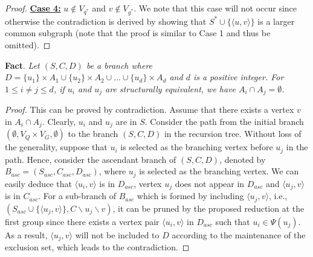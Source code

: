 \begin{proof}
    \smallskip
    \noindent\underline{\textbf{Case 4:}} $u\notin V_{q^*}$ and $v\notin V_{g^*}$. We note that this case will not occur since otherwise the contradiction is derived by showing that $S^*\cup \{\langle u,v\rangle\}$ is a larger common subgraph (note that the proof is similar to Case 1 and thus be omitted).
\end{proof}


\smallskip
\noindent\textbf{Fact}. \emph{Let $(S,C,D)$ be a branch where $D=\{u_1\}\times A_1 \cup \{u_2\} \times A_2 \cup ... \cup \{u_d\}\times A_d$ and $d$ is a positive integer. For $1\leq i\neq j \leq d$, if $u_i$ and $u_j$ are structurally equivalent, we have $A_i\cap A_j = \emptyset$.}
\begin{proof}
    This can be proved by contradiction. Assume that there exists a vertex $v$ in $A_i\cap A_j$. Clearly, $u_i$ and $u_j$ are in $S$. Consider the path from the initial branch $(\emptyset,V_Q\times V_G,\emptyset)$ to the branch $(S,C,D)$ in the recursion tree. Without loss of the generality, suppose that $u_i$ is selected as the branching vertex before $u_j$ in the path. Hence, consider the ascendant branch of $(S,C,D)$, denoted by $B_{asc}=(S_{asc},C_{asc},D_{asc})$, where $u_j$ is selected as the branching vertex. We can easily deduce that $\langle u_i,v \rangle$ is in $D_{asc}$, vertex $u_j$ does not appear in $D_{asc}$ and $\langle u_j,v \rangle$ is in $C_{asc}$. For a sub-branch of $B_{asc}$ which is formed by including $\langle u_j,v \rangle$, i.e., $(S_{asc}\cup\{\langle u_j,v \rangle\}, C\backslash u_j\backslash v)$, it can be pruned by the proposed reduction at the first group since there exists a vertex pair $\langle u_i,v \rangle$ in $D_{asc}$ such that $u_i\in \Psi (u_j)$. As a result, $\langle u_j,v \rangle$ will not be included to $D$ according to the maintenance of the exclusion set, which leads to the contradiction.
\end{proof}